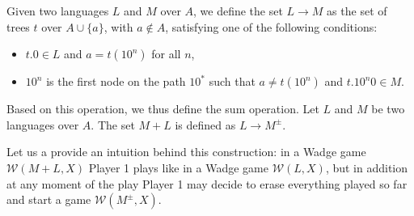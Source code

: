 \vspace{0.2cm}
Given two languages $L$ and $M$ over $A$, we define
 the set $L \to M$ as the set of trees $t$ over $A \cup\{a\}$, with $a \notin A$, satisfying one of the following conditions:

\begin{itemize}
\item $t.0 \in L$ and $a = t(10^n)$ for all $n$,
\item $10^{n}$ is the first node on the path $10^*$ such that $a \neq t(10^{n})$ and $t.10^{n}0 \in M$.
\end{itemize}

Based on this operation, we thus define the sum operation.
Let $L$ and $ M $ be two languages over $A$. The set $M+ L$ is defined as $L \to M^\pm$. 

Let us a provide an intuition behind this construction: in a Wadge game $\mathcal{W}(M+L, X)$ Player 1 plays like in a Wadge game $\mathcal{W}(L, X)$, but in addition at any moment of the play Player 1 may decide to erase everything played so far and start a game
$\mathcal{W}(M^\pm, X)$. %


%

